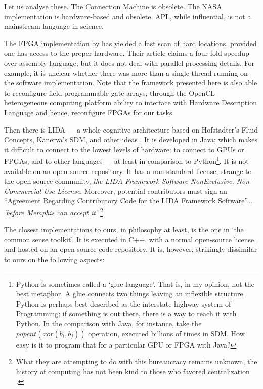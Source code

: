 Let us analyse these.  The Connection Machine is obsolete.  The NASA implementation is hardware-based and obsolete.  APL, while influential, is not a mainstream language in science.

The FPGA implementation by \citet{silva_reconfigurable_2004} has yielded a fast scan of hard locations, provided one has access to the proper hardware. Their article claims a four-fold speedup over assembly language; but it does not deal with parallel processing details.  For example, it is unclear whether there was more than a single thread running on the software implementation.  Note that the framework presented here is also able to reconfigure field-programmable gate arrays, through the OpenCL heterogeneous computing platform ability to interface with Hardware Description Language and hence, reconfigure FPGAs \citep{waidyasooriya2018design, czajkowski_opencl_2012} for our tasks.

Then there is LIDA --- a whole cognitive architecture based on Hofstadter's Fluid Concepts, Kanerva's SDM, and other ideas \citep{Anwar2003, snaider_integer_2013, snaider_modular_2014, franklin_lida:_2014}.  It is developed in Java; which makes it difficult to connect to the lowest levels of hardware; to connect to GPUs or FPGAs, and to other languages --- at least in comparison to Python\footnote{Python is sometimes called a `glue language'. That is, in my opinion, not the best metaphor.  A glue connects two things leaving an inflexible structure.  Python is perhaps best described as the interstate highway system of Programming; if something is out there, there is a way to reach it with Python.  In the comparison with Java, for instance, take the $popcnt(xor(b_i,b_j))$ operation, executed billions of times in SDM. How easy is it to program that for a particular GPU or FPGA with Java?}.  It is not available on an open-source repository.  It has a non-standard license, strange to the open-source community, \emph{the LIDA Framework Software NonExclusive, Non-Commercial Use License}.  Moreover, potential contributors must sign an ``Agreement Regarding Contributory Code for the LIDA Framework Software''... \emph{`before Memphis can accept it'} \footnote{What they are attempting to do with this bureaucracy remains unknown, the history of computing has not been kind to those who favored centralization \citep{ferguson_computer_2002}.}.

The closest implementations to ours, in philosophy at least, is the one in `the common sense toolkit'. It is executed in C++, with a normal open-source license, and hosted on an open-source code repository.  It is, however, strikingly dissimilar to ours on the following aspects:

